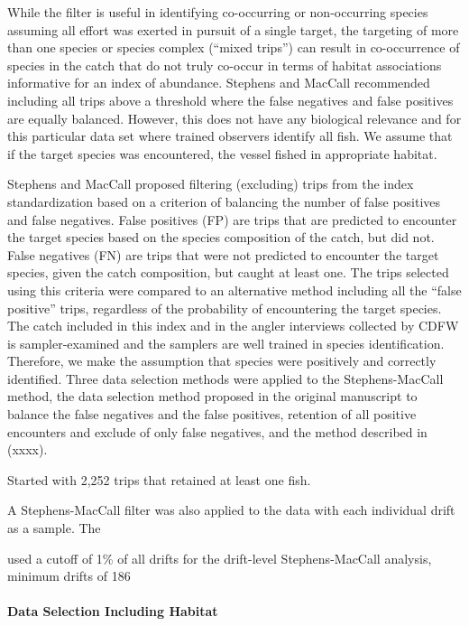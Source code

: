 \documentclass[preprint, 3p,
authoryear]{elsarticle} %
\begin{document}
While the filter is useful in identifying co-occurring or non-occurring
species assuming all effort was exerted in pursuit of a single target,
the targeting of more than one species or species complex (``mixed
trips'') can result in co-occurrence of species in the catch that do not
truly co-occur in terms of habitat associations informative for an index
of abundance. Stephens and MacCall \citeyearpar{Stephens2004}
recommended including all trips above a threshold where the false
negatives and false positives are equally balanced. However, this does
not have any biological relevance and for this particular data set where
trained observers identify all fish. We assume that if the target
species was encountered, the vessel fished in appropriate habitat.

Stephens and MacCall \citeyearpar{Stephens2004} proposed filtering
(excluding) trips from the index standardization based on a criterion of
balancing the number of false positives and false negatives. False
positives (FP) are trips that are predicted to encounter the target
species based on the species composition of the catch, but did not.
False negatives (FN) are trips that were not predicted to encounter the
target species, given the catch composition, but caught at least one.
The trips selected using this criteria were compared to an alternative
method including all the ``false positive'' trips, regardless of the
probability of encountering the target species. The catch included in
this index and in the angler interviews collected by CDFW is
sampler-examined and the samplers are well trained in species
identification. Therefore, we make the assumption that species were
positively and correctly identified. Three data selection methods were
applied to the Stephens-MacCall method, the data selection method
proposed in the original manuscript to balance the false negatives and
the false positives, retention of all positive encounters and exclude of
only false negatives, and the method described in (xxxx).

Started with 2,252 trips that retained at least one fish.

A Stephens-MacCall filter was also applied to the data with each
individual drift as a sample. The

used a cutoff of 1\% of all drifts for the drift-level Stephens-MacCall
analysis, minimum drifts of 186

\hypertarget{data-selection-including-habitat}{%
\paragraph{Data Selection Including
Habitat}\label{data-selection-including-habitat}}
\end{document}
